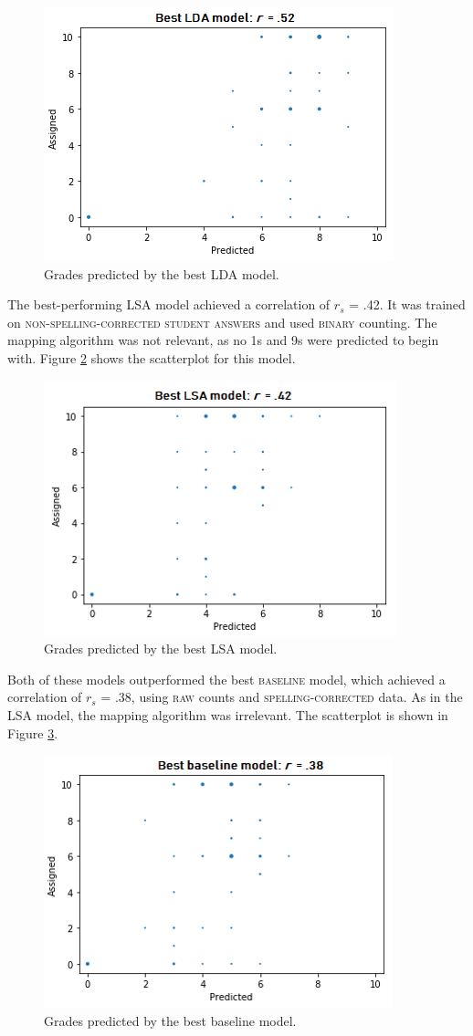 \documentclass[a4paper,10pt,twoside]{article}
\begin{document}
\begin{figure}[h]
\centering
\includegraphics[width=0.5\linewidth]{"Best LDA model"}
\caption{Grades predicted by the best LDA model.}
\label{lda}
\end{figure}

The best-performing LSA model achieved a correlation of $\textit{r}_s$ = .42. It was trained on \textsc{non-spelling-corrected} \textsc{student answers} and used \textsc{binary} counting. The mapping algorithm was not relevant, as no 1s and 9s were predicted to begin with. Figure \ref{lsa} shows the scatterplot for this model.

\begin{figure}[h]
\centering
\includegraphics[width=0.5\linewidth]{"Best LSA model"}
\caption{Grades predicted by the best LSA model.}
\label{lsa}
\end{figure}

Both of these models outperformed the best \textsc{baseline} model, which achieved a correlation of $\textit{r}_s$ = .38, using \textsc{raw} counts and \textsc{spelling-corrected} data. As in the LSA model, the mapping algorithm was irrelevant. The scatterplot is shown in Figure \ref{baseline}.

\begin{figure}[h]
\centering
\includegraphics[width=0.5\linewidth]{"Best baseline model"}
\caption{Grades predicted by the best baseline model.}
\label{baseline}
\end{figure}
\end{document}
